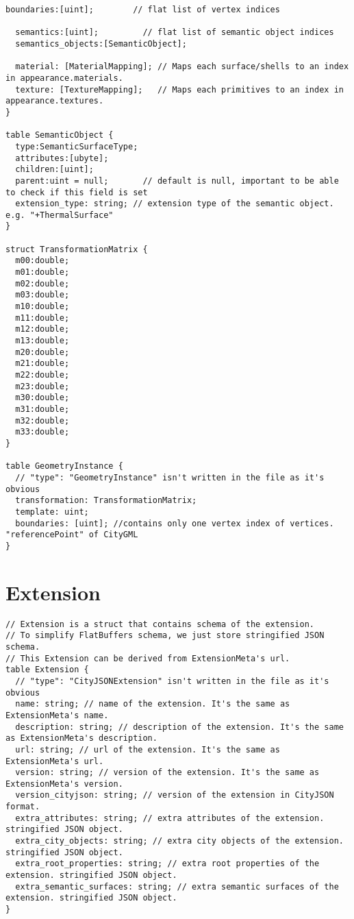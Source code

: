 \begin{lstlisting}[caption={Geometry schema of FlatCityBuf}, basicstyle=\small]
  boundaries:[uint];        // flat list of vertex indices

  semantics:[uint];         // flat list of semantic object indices
  semantics_objects:[SemanticObject];

  material: [MaterialMapping]; // Maps each surface/shells to an index in appearance.materials.
  texture: [TextureMapping];   // Maps each primitives to an index in appearance.textures.
}

table SemanticObject {
  type:SemanticSurfaceType;
  attributes:[ubyte];
  children:[uint];
  parent:uint = null;       // default is null, important to be able to check if this field is set
  extension_type: string; // extension type of the semantic object. e.g. "+ThermalSurface"
}

struct TransformationMatrix {
  m00:double;
  m01:double;
  m02:double;
  m03:double;
  m10:double;
  m11:double;
  m12:double;
  m13:double;
  m20:double;
  m21:double;
  m22:double;
  m23:double;
  m30:double;
  m31:double;
  m32:double;
  m33:double;
}

table GeometryInstance {
  // "type": "GeometryInstance" isn't written in the file as it's obvious
  transformation: TransformationMatrix;
  template: uint;
  boundaries: [uint]; //contains only one vertex index of vertices. "referencePoint" of CityGML
}
\end{lstlisting}

\section{Extension}
\label{appendix:flatcitybuf_schema:extension}
\begin{lstlisting}[caption={Extension schema of FlatCityBuf}, basicstyle=\small]
// Extension is a struct that contains schema of the extension.
// To simplify FlatBuffers schema, we just store stringified JSON schema.
// This Extension can be derived from ExtensionMeta's url.
table Extension {
  // "type": "CityJSONExtension" isn't written in the file as it's obvious
  name: string; // name of the extension. It's the same as ExtensionMeta's name.
  description: string; // description of the extension. It's the same as ExtensionMeta's description.
  url: string; // url of the extension. It's the same as ExtensionMeta's url.
  version: string; // version of the extension. It's the same as ExtensionMeta's version.
  version_cityjson: string; // version of the extension in CityJSON format.
  extra_attributes: string; // extra attributes of the extension. stringified JSON object.
  extra_city_objects: string; // extra city objects of the extension. stringified JSON object.
  extra_root_properties: string; // extra root properties of the extension. stringified JSON object.
  extra_semantic_surfaces: string; // extra semantic surfaces of the extension. stringified JSON object.
}
\end{lstlisting}

